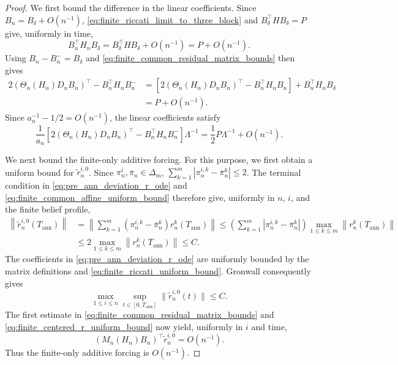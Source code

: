 \documentclass[12pt]{article}
\numberwithin{equation}{section}
\theoremstyle{definition}
\begin{document}
\begin{proof}
We first bound the difference in the linear coefficients. Since \(B_n=B_\delta+O(n^{-1})\),
\eqref{eq:finite_riccati_limit_to_three_block} and
\(B_\delta^\top HB_\delta=P\) give, uniformly in time,
\[
B_n^\top H_nB_\delta
=B_\delta^\top HB_\delta+O(n^{-1})
=P+O(n^{-1}).
\]
Using \(B_n-B_n^-=B_\delta\) and
\eqref{eq:finite_common_residual_matrix_bounds} then gives
\[
\begin{aligned}
2\left(\Theta_n(H_n)D_nB_n\right)^\top-B_n^\top H_nB_n^-
&=
\left[
2\left(\Theta_n(H_n)D_nB_n\right)^\top-B_n^\top H_nB_n
\right]
+B_n^\top H_nB_\delta\\
&=P+O(n^{-1}).
\end{aligned}
\]
Since \(a_n^{-1}-1/2=O(n^{-1})\), the linear coefficients satisfy
\[
\frac1{a_n}
\left[
2\left(\Theta_n(H_n)D_nB_n\right)^\top-B_n^\top H_nB_n^-
\right]\Lambda^{-1}
=\frac12P\Lambda^{-1}+O(n^{-1}).
\]

We next bound the finite-only additive forcing. For this purpose, we
first obtain a uniform bound for \(\widetilde r_n^{i,0}\). Since
\(\pi_n^i,\bar\pi_n\in\Delta_m\),
\(
\sum_{k=1}^m
|\pi_n^{i,k}-\bar\pi_n^k|
\leq 2
\).
The terminal condition in \eqref{eq:pre_ann_deviation_r_ode} and
\eqref{eq:finite_common_affine_uniform_bound} therefore give, uniformly in
\(n\), \(i\), and the finite belief profile,
\[
\begin{aligned}
\left\|\widetilde r_n^{i,0}(T_{\mathrm{ann}})\right\|
&=
\left\|
\sum_{k=1}^m
(\pi_n^{i,k}-\bar\pi_n^k)r_n^k(T_{\mathrm{ann}})
\right\|
\leq
\left(
\sum_{k=1}^m
|\pi_n^{i,k}-\bar\pi_n^k|
\right)
\max_{1\leq k\leq m}
\left\|r_n^k(T_{\mathrm{ann}})\right\|
\\
&\leq
2\max_{1\leq k\leq m}
\left\|r_n^k(T_{\mathrm{ann}})\right\|
\leq C.
\end{aligned}
\]
The coefficients in \eqref{eq:pre_ann_deviation_r_ode} are uniformly bounded
by the matrix definitions and \eqref{eq:finite_riccati_uniform_bound}.
Gronwall consequently gives
\begin{equation}\label{eq:finite_centered_r_uniform_bound}
\max_{1\leq i\leq n}
\sup_{t\in[0,T_{\mathrm{ann}}]}
\|\widetilde r_n^{i,0}(t)\|
\leq C.
\end{equation}
The first estimate in \eqref{eq:finite_common_residual_matrix_bounds} and
\eqref{eq:finite_centered_r_uniform_bound} now yield, uniformly in \(i\) and
time,
\[
\left(M_n(H_n)B_n\right)^\top\widetilde r_n^{i,0}
=O(n^{-1}).
\]
Thus the finite-only additive forcing is \(O(n^{-1})\).


\end{proof}
\end{document}
